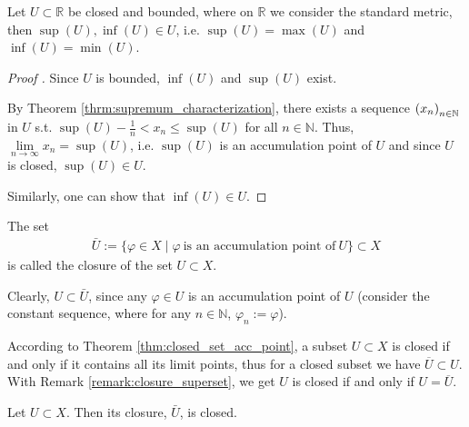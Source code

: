 \begin{corollary}\label{corollary:closed_bounded_subsets_contain_inf_sup}
	Let $U\subset \mathbb R$ be closed and bounded, where on $\mathbb R$ we consider the standard metric, then $\sup(U), \inf(U) \in U$, i.e. $\sup(U) = \max(U)$ and $\inf(U) = \min(U)$.
\end{corollary}

\begin{proof}[Proof \cite{2752236}]
	Since $U$ is bounded, $\inf(U)$ and $\sup(U)$ exist. 
	
	By Theorem \ref{thrm:supremum_characterization}, there exists a sequence $\seq[x_n]$ in $U$ s.t. $\sup(U) - \frac{1}{n} < x_n \leq \sup(U)$ for all $n\in\mathbb N$. Thus, $\lim\limits_{n\to\infty}x_n = \sup(U)$, i.e. $\sup(U)$ is an accumulation point of $U$ and since $U$ is closed, $\sup(U)\in U$.
	
	Similarly, one can show that $\inf(U)\in U$.
\end{proof}

\begin{defn}\label{defn:closure_set}
	The set 
	\begin{align}
		\bar{U} := \{\varphi\in X\mid \varphi\ \text{is an accumulation point of}\ U\} \subset X
	\end{align}
	is called the closure of the set $U \subset X$.
\end{defn}

\begin{remark}\label{remark:closure_superset}
	Clearly, $U\subset \bar{U}$, since any $\varphi\in U$ is an accumulation point of $U$ (consider the constant sequence, where for any $n\in\mathbb N$, $\varphi_n := \varphi$).
\end{remark}

\begin{remark}
	According to Theorem \ref{thm:closed_set_acc_point}, a subset $U\subset X$ is closed if and only if it contains all its limit points, thus for a closed subset we have $\overline{U} \subset U$. With Remark \ref{remark:closure_superset}, we get $U$ is closed if and only if $U = \overline{U}$.
\end{remark}

\begin{theorem}\label{thrm:closure_closed}
	Let $U\subset X$. Then its closure, $\bar{U}$, is closed.
\end{theorem}

